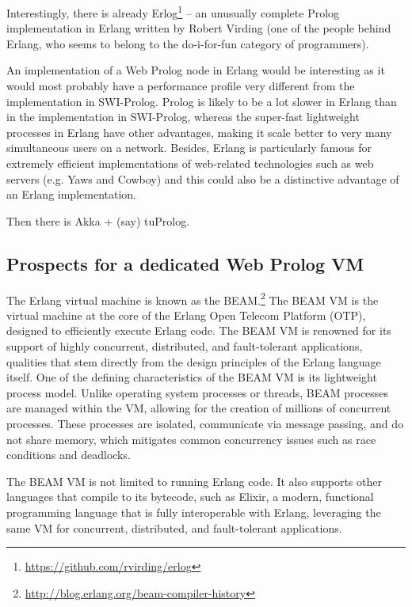 
Interestingly, there is already Erlog\footnote{\url{https://github.com/rvirding/erlog}} -- an unusually complete Prolog implementation in Erlang written by Robert Virding (one of the people behind Erlang, who seems to belong to the do-i-for-fun category of programmers). 

An implementation of a Web Prolog node in Erlang would be interesting as it would most probably have a performance profile very different from the implementation in SWI-Prolog. Prolog is likely to be a lot slower in Erlang than in the implementation in SWI-Prolog, whereas the super-fast lightweight processes in Erlang have other advantages, making it scale better to very many simultaneous users on a network. Besides, Erlang is particularly famous for extremely efficient implementations of web-related technologies such as web servers (e.g. Yaws and Cowboy) and this could also be a distinctive advantage of an Erlang implementation.

Then there is Akka + (say) tuProlog.

\subsection{Prospects for a dedicated Web Prolog VM}\label{sec:web-prolog-vm}

The Erlang virtual machine is known as the BEAM.\footnote{\url{http://blog.erlang.org/beam-compiler-history}}  The BEAM VM is the virtual machine at the core of the Erlang Open Telecom Platform (OTP), designed to efficiently execute Erlang code. The BEAM VM is renowned for its support of highly concurrent, distributed, and fault-tolerant applications, qualities that stem directly from the design principles of the Erlang language itself. One of the defining characteristics of the BEAM VM is its lightweight process model. Unlike operating system processes or threads, BEAM processes are managed within the VM, allowing for the creation of millions of concurrent processes. These processes are isolated, communicate via message passing, and do not share memory, which mitigates common concurrency issues such as race conditions and deadlocks. 

The BEAM VM is not limited to running Erlang code. It also supports other languages that compile to its bytecode, such as Elixir, a modern, functional programming language that is fully interoperable with Erlang, leveraging the same VM for concurrent, distributed, and fault-tolerant applications. 

